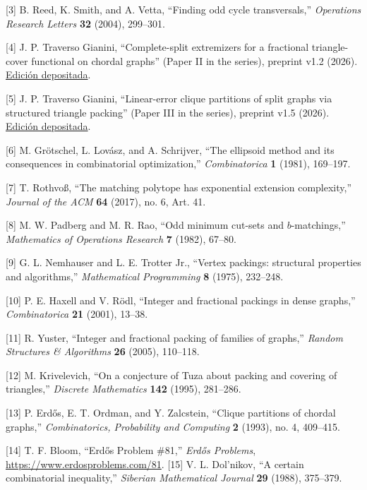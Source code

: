 \documentclass[spanish,11pt,a4paper]{article}
\begin{document}
{[}3{]} B. Reed, K. Smith, and A. Vetta, ``Finding odd cycle
transversals,'' \emph{Operations Research Letters} \textbf{32} (2004),
299--301.

{[}4{]} J. P. Traverso Gianini, ``Complete-split extremizers for a
fractional triangle-cover functional on chordal graphs'' (Paper II in
the series), preprint v1.2 (2026).
\href{https://doi.org/10.5281/zenodo.23089131}{Edición depositada}.

{[}5{]} J. P. Traverso Gianini, ``Linear-error clique partitions of
split graphs via structured triangle packing'' (Paper III in the
series), preprint v1.5 (2026).
\href{https://doi.org/10.5281/zenodo.23089131}{Edición depositada}.

{[}6{]} M. Grötschel, L. Lovász, and A. Schrijver, ``The ellipsoid
method and its consequences in combinatorial optimization,''
\emph{Combinatorica} \textbf{1} (1981), 169--197.

{[}7{]} T. Rothvoß, ``The matching polytope has exponential extension
complexity,'' \emph{Journal of the ACM} \textbf{64} (2017), no. 6, Art.
41.

{[}8{]} M. W. Padberg and M. R. Rao, ``Odd minimum cut-sets and
\(b\)-matchings,'' \emph{Mathematics of Operations Research} \textbf{7}
(1982), 67--80.

{[}9{]} G. L. Nemhauser and L. E. Trotter Jr., ``Vertex packings:
structural properties and algorithms,'' \emph{Mathematical Programming}
\textbf{8} (1975), 232--248.

{[}10{]} P. E. Haxell and V. Rödl, ``Integer and fractional packings in
dense graphs,'' \emph{Combinatorica} \textbf{21} (2001), 13--38.

{[}11{]} R. Yuster, ``Integer and fractional packing of families of
graphs,'' \emph{Random Structures \& Algorithms} \textbf{26} (2005),
110--118.

{[}12{]} M. Krivelevich, ``On a conjecture of Tuza about packing and
covering of triangles,'' \emph{Discrete Mathematics} \textbf{142}
(1995), 281--286.

{[}13{]} P. Erdős, E. T. Ordman, and Y. Zalcstein, ``Clique partitions
of chordal graphs,'' \emph{Combinatorics, Probability and Computing}
\textbf{2} (1993), no. 4, 409--415.

{[}14{]} T. F. Bloom, ``Erdős Problem \#81,'' \emph{Erdős Problems},
\url{https://www.erdosproblems.com/81}. {[}15{]} V. L. Dol'nikov, ``A
certain combinatorial inequality,'' \emph{Siberian Mathematical Journal}
\textbf{29} (1988), 375--379.
\end{document}
